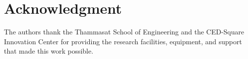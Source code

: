 \documentclass[conference]{IEEEtran}
\newif\ifblindreview
\newcommand{\blind}[1]{\colorbox{black}{\textcolor{black}{#1}}}
\newcommand{\blind}[1]{#1}
\begin{document}
\ifblindreview
\section*{Acknowledgment}
\noindent\blind{\parbox{\dimexpr\columnwidth-2\fboxsep\relax}{The authors thank the Thammasat School of Engineering and the CED-Square Innovation Center for providing the research facilities, equipment, and support that made this work possible.}}
\else
\section*{Acknowledgment}
The authors thank the Thammasat School of Engineering and the CED-Square Innovation Center for providing the research facilities, equipment, and support that made this work possible.
\fi
\end{document}
